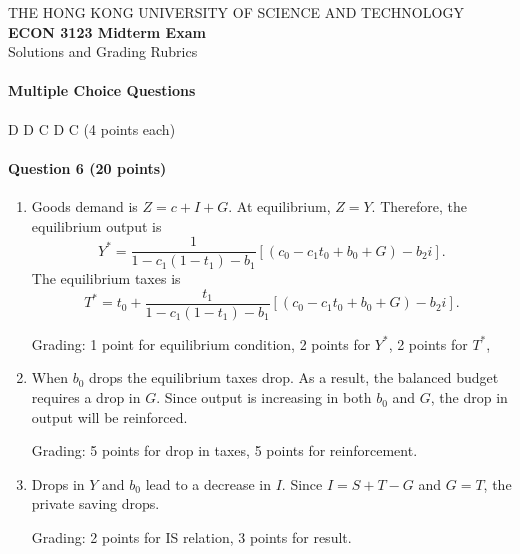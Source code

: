 \documentclass[12pt]{article}
\begin{document}
\thispagestyle{empty}

\begin{center}
    THE HONG KONG UNIVERSITY OF SCIENCE AND TECHNOLOGY\\
    {\large \textbf{ECON 3123 Midterm Exam}}\\
    Solutions and Grading Rubrics
\end{center}

\paragraph{Multiple Choice Questions} D D C D C (4 points each)

\paragraph{Question 6 (20 points)}
\begin{enumerate}[label=\alph*.]
	\item Goods demand is $Z=c+I+G$. At equilibrium, $Z=Y$. Therefore, the equilibrium output is
	\[Y^* = \frac{1}{1-c_1(1-t_1)-b_1}[(c_0-c_1t_0+b_0+G)-b_2 i].\]
	The equilibrium taxes is
	\[T^* = t_0 + \frac{t_1}{1-c_1(1-t_1)-b_1}[(c_0-c_1t_0+b_0+G)-b_2 i].\]

	Grading: 1 point for equilibrium condition, 2 points for $Y^*$, 2 points for $T^*$,

	\item When $b_0$ drops the equilibrium taxes drop. As a result, the balanced budget requires a drop in $G$. Since output is increasing in both $b_0$ and $G$, the drop in output will be reinforced.
	
	Grading: 5 points for drop in taxes, 5 points for reinforcement.

	\item Drops in $Y$ and $b_0$ lead to a decrease in $I$. Since $I = S+T-G$ and $G=T$, the private saving drops.
	
	Grading: 2 points for IS relation, 3 points for result.
\end{enumerate}
\end{document}
